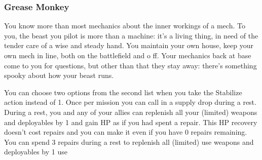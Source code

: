 \subsubsection{Grease Monkey}

\begin{talent}
{You know more than most mechanics about the inner workings of a mech. To you, the beast you pilot is more than a machine: it's a living thing, in need of the tender care of a wise and steady hand. You maintain your own house, keep your own mech in line, both on the battlefield and o ff. Your mechanics back at base come to you for questions, but other than that they stay away: there's something spooky about how your beast runs.}

You can choose two options from the second list when you take the Stabilize action instead of 1. 
Once per mission you can call in a supply drop during a rest. During a rest, you and any of your allies can replenish all your (limited) weapons and deployables by 1 and gain HP as if you had spent a repair. This HP recovery doesn't cost repairs and you can make it even if you have 0 repairs remaining. 
You can spend 3 repairs during a rest to replenish all (limited) use weapons and deployables by 1 use
\end{talent}